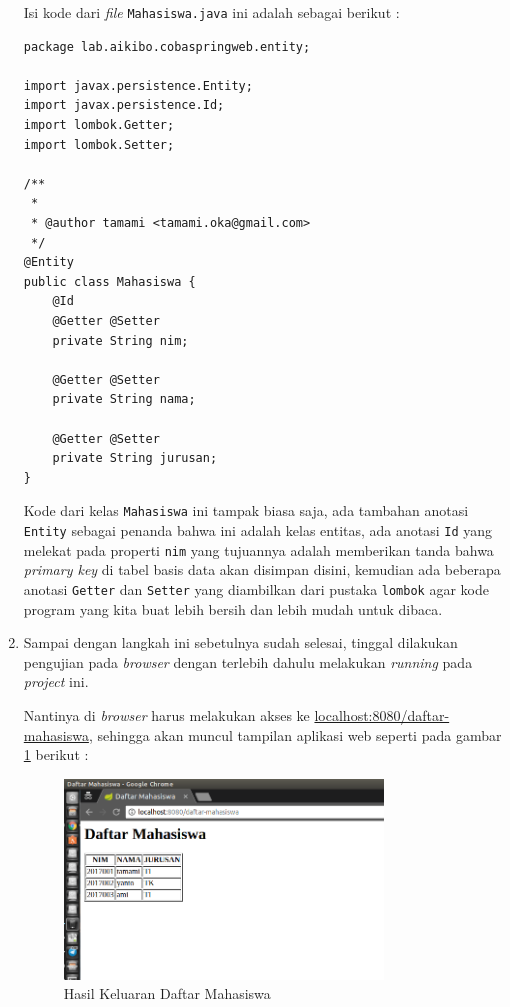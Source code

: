 \begin{enumerate}
	Isi kode dari \textit{file} \texttt{Mahasiswa.java} ini adalah sebagai berikut :
	
	\begin{lstlisting}
package lab.aikibo.cobaspringweb.entity;

import javax.persistence.Entity;
import javax.persistence.Id;
import lombok.Getter;
import lombok.Setter;

/**
 *
 * @author tamami <tamami.oka@gmail.com>
 */
@Entity
public class Mahasiswa {    
    @Id
    @Getter @Setter
    private String nim;
    
    @Getter @Setter
    private String nama;
    
    @Getter @Setter
    private String jurusan;    
}
	\end{lstlisting}
	
	Kode dari kelas \texttt{Mahasiswa} ini tampak biasa saja, ada tambahan anotasi \texttt{Entity} sebagai penanda bahwa ini adalah kelas entitas, ada anotasi \texttt{Id} yang melekat pada properti \texttt{nim} yang tujuannya adalah memberikan tanda bahwa \textit{primary key} di tabel basis data akan disimpan disini, kemudian ada beberapa anotasi \texttt{Getter} dan \texttt{Setter} yang diambilkan dari pustaka \texttt{lombok} agar kode program yang kita buat lebih bersih dan lebih mudah untuk dibaca.
	
	\item Sampai dengan langkah ini sebetulnya sudah selesai, tinggal dilakukan pengujian pada \textit{browser} dengan terlebih dahulu melakukan \textit{running} pada \textit{project} ini. 
	
	Nantinya di \textit{browser} harus melakukan akses ke \url{localhost:8080/daftar-mahasiswa}, sehingga akan muncul tampilan aplikasi web seperti pada gambar \ref{fig:output-daftar-mahasiswa} berikut :
	
	\begin{figure}[H]
		\centering
		\includegraphics[width=0.8\textwidth]{./resources/013-output-daftar-mahasiswa}
		\caption{Hasil Keluaran Daftar Mahasiswa}
		\label{fig:output-daftar-mahasiswa}
	\end{figure}	
\end{enumerate}

